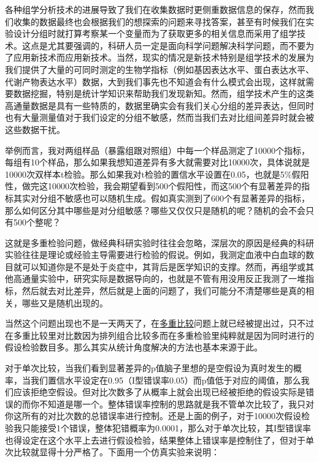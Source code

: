 \documentclass[]{tufte-book}
\begin{document}
各种组学分析技术的进展导致了我们在收集数据时更侧重数据信息的保存，然而我们收集的数据最终也会根据我们的想探索的问题来寻找答案，甚至有时候我们在实验设计分组时就打算考察某一个变量而为了获取更多的相关信息而采用了组学技术。这点是尤其要强调的，科研人员一定是面向科学问题解决科学问题，而不要为了应用新技术而应用新技术。当然，现实的情况是新技术特别是组学技术的发展为我们提供了大量的可同时测定的生物学指标（例如基因表达水平、蛋白表达水平、代谢产物表达水平）数据，大到我们事先也不知道会有什么模式会出现，这样就需要数据挖掘，特别是统计学知识来帮助我们发现新知。然而，组学技术产生的这类高通量数据是具有一些特质的，数据里确实会有我们关心分组的差异表达，但同时也有大量测量值对于我们设定的分组不敏感，然而当我们去对比组间差异时就会被这些数据干扰。

举例而言，我对两组样品（暴露组跟对照组）中每一个样品测定了10000个指标，每组有10个样品，那么如果我想知道差异有多大就需要对比10000次，具体说就是10000次双样本t检验。那么如果我对t检验的置信水平设置在0.05，也就是5\%假阳性，做完这10000次检验，我会期望看到500个假阳性，而这500个有显著差异的指标其实对分组不敏感也可以随机生成。假如真实测到了600个有显著差异的指标，那么如何区分其中哪些是对分组敏感？哪些又仅仅只是随机的呢？随机的会不会只有500个整呢？

这就是多重检验问题，做经典科研实验时往往会忽略，深层次的原因是经典的科研实验往往是理论或经验主导需要进行检验的假说。例如，我测定血液中白血球的数目就可以知道你是不是处于炎症中，其背后是医学知识的支撑。然而，再组学或其他高通量实验中，研究实际是数据导向的，也就是不管有用没用反正我测了一堆指标，然后就去对比差异，然后就是上面的问题了，我们可能分不清楚哪些是真的相关，哪些又是随机出现的。

当然这个问题出现也不是一天两天了，在\href{http://yufree.cn/blogcn/2013/12/16/rgabriel-package.html}{多重比较}问题上就已经被提出过，只不过在多重比较里对比数因为排列组合比较多而在多重检验里纯粹就是因为同时进行的假设检验数目多。那么其实从统计角度解决的方法也基本来源于此。

对于单次比较，当我们看到显著差异的p值脑子里想的是空假设为真时发生的概率，当我们置信水平设定在0.95（I型错误率0.05）而p值低于对应的阈值，那么我们应该拒绝空假设。但对比次数多了从概率上就会出现已经被拒绝的假设实际是错误的而你不知道是哪一个。整体错误率控制的思路就是我不管单次比较了，我只对你这所有的对比次数的总错误率进行控制。还是上面的例子，对于10000次假设检验我只能接受1个错误，整体犯错概率为0.0001，那么对于单次比较，其I型错误率也得设定在这个水平上去进行假设检验，结果整体上错误率是控制住了，但对于单次比较就显得十分严格了。下面用一个仿真实验来说明：
\end{document}
